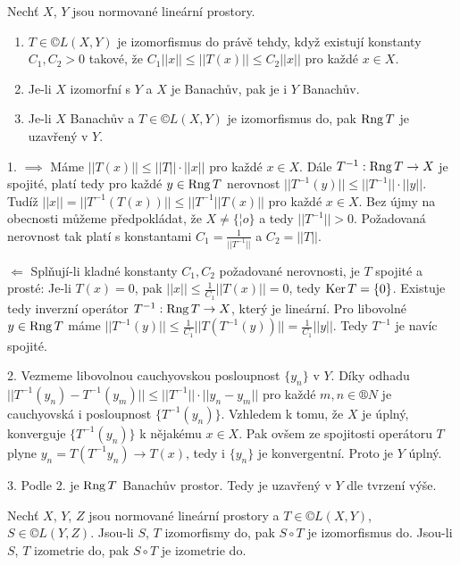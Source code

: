 \documentclass[12pt]{article}					%
\begin{document}
\begin{tvrzeni}
	Nechť $X$, $Y$ jsou normované lineární prostory.

	\begin{enumerate}
		\item $T \in ©L(X, Y)$ je izomorfismus do právě tehdy, když existují konstanty $C_1, C_2 > 0$ takové, že $C_1 ||x|| ≤ ||T(x)|| ≤ C_2 ||x||$ pro každé $x \in X$.
		\item Je-li $X$ izomorfní s $Y$ a $X$ je Banachův, pak je i $Y$ Banachův.
		\item Je-li $X$ Banachův a $T \in ©L(X, Y)$ je izomorfismus do, pak $\operatorname{Rng} T$ je uzavřený v $Y$.
	\end{enumerate}

	\begin{dukazin}[Ze skript]
		1. $\implies$ Máme $||T(x)|| ≤ ||T||·||x||$ pro každé $x \in X$. Dále $T^{-1}: \operatorname{Rng} T \rightarrow X$ je spojité, platí tedy pro každé $y \in \operatorname{Rng} T$ nerovnost $||T^{-1}(y)|| ≤ ||T^{-1}||·||y||$. Tudíž $||x|| = ||T^{-1}(T(x))|| ≤ ||T^{-1}||T(x)||$ pro každé $x \in X$. Bez újmy na obecnosti můžeme předpokládat, že $X ≠ \{¦o\}$ a tedy $||T^{-1}|| > 0$. Požadovaná nerovnost tak platí s konstantami $C_1 = \frac{1}{||T^{-1}||}$ a $C_2 = ||T||$.

		$\Leftarrow$ Splňují-li kladné konstanty $C_1, C_2$ požadované nerovnosti, je $T$ spojité a prosté: Je-li $T(x) = 0$, pak $||x|| ≤ \frac{1}{C_1}||T(x)|| = 0$, tedy $\operatorname{Ker} T = \{0\}$. Existuje tedy inverzní operátor $T^{-1}: \operatorname{Rng} T \rightarrow X$, který je lineární. Pro libovolné $y \in \operatorname{Rng} T$ máme $||T^{-1}(y)|| ≤ \frac{1}{C_1}||T(T^{-1}(y))|| = \frac{1}{C_1}||y||$. Tedy $T^{-1}$ je navíc spojité.

		2. Vezmeme libovolnou cauchyovskou posloupnost $\{y_n\}$ v $Y$. Díky odhadu $||T^{-1}(y_n) - T^{-1}(y_m)|| ≤ ||T^{-1}||·||y_n - y_m||$ pro každé $m, n \in ®N$ je cauchyovská i posloupnost $\{T^{-1}(y_n)\}$. Vzhledem k tomu, že $X$ je úplný, konverguje $\{T^{-1}(y_n)\}$ k nějakému $x \in X$. Pak ovšem ze spojitosti operátoru $T$ plyne $y_n = T(T^{-1}y_n) \rightarrow T(x)$, tedy i $\{y_n\}$ je konvergentní. Proto je $Y$ úplný.

		3. Podle 2. je $\operatorname{Rng} T$ Banachův prostor. Tedy je uzavřený v $Y$ dle tvrzení výše.
	\end{dukazin}
\end{tvrzeni}

\begin{poznamka}[Fakt]
	Nechť $X$, $Y$, $Z$ jsou normované lineární prostory a $T \in ©L(X, Y)$, $S \in ©L(Y, Z)$. Jsou-li $S$, $T$ izomorfismy do, pak $S \circ T$ je izomorfismus do. Jsou-li $S$, $T$ izometrie do, pak $S \circ T$ je izometrie do.
\end{poznamka}
\end{document}
